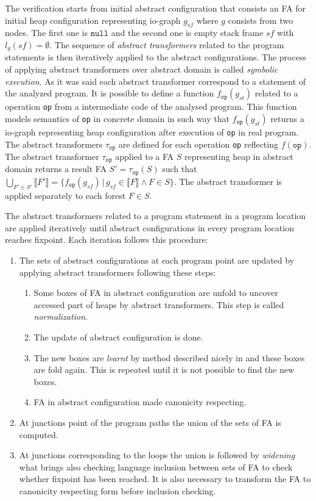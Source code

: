The verification starts from initial abstract configuration that consists an FA for initial heap configuration representing io-graph
$g_{sf}$ where $g$ consists from two nodes.
The first one is $\texttt{null}$ and the second one is empty stack frame $sf$ with $l_g(sf) = \emptyset$.
The sequence of \emph{abstract transformers} related to the program statements is then iteratively applied to the abstract configurations.
The process of applying abstract transformers over abstract domain is called \emph{symbolic execution}.
As it was said each abstract transformer correspond to a statement of the analyzed program.
It is possible to define a function $f_{\texttt{op}}(g_{st})$ related to a operation \texttt{op} from a intermediate code of the analysed program.
This function models semantics of \texttt{op} in concrete domain in such way that $f_{\texttt{op}}(g_{st})$
returns a io-graph representing heap configuration after execution of \texttt{op} in real program.
The abstract transformers $\tau_{\texttt{op}}$ are defined for each operation \texttt{op} reflecting $f(\texttt{op})$.
The abstract transformer $\tau_{\texttt{op}}$ applied to a FA $S$ representing heap in abstract domain returns a result FA $S' = \tau_{\texttt{op}}(S)$
such that $\bigcup_{F' \in S'} \llbracket F' \rrbracket = \{ f_{\texttt{op}}(g_{sf}) \,|\, g_{sf} \in \llbracket F \rrbracket \wedge F \in S \}$.
The abstract transformer is applied separately to each forest $F \in S$.

The abstract transformers related to a program statement in a program location are applied iteratively until
abstract configurations in every program location reaches fixpoint.
Each iteration follows this procedure:
\begin{enumerate}
		\item The sets of abstract configurations at each program point are updated by applying abstract transformers following
			these steps:
			\begin{enumerate}
				\item Some boxes of FA in abstract configuration are unfold to uncover accessed part of heaps by abstract transformers.
					This step is called \emph{normalization}.
				\item The update of abstract configuration is done.
				\item The new boxes are \emph{learnt} by method described nicely in \cite{forester13}
					and these boxes are fold again.
					This is repeated until it is not possible to find the new boxes.
				\item FA in abstract configuration made canonicity respecting.
			\end{enumerate}
		\item At junctions point of the program paths the union of the sets of FA is computed.
		\item At junctions corresponding to the loops the union is followed by \emph{widening}
			what brings also checking language inclusion between sets of FA to check whether fixpoint has been reached.
			It is also necessary to transform the FA to canonicity respecting form before inclusion checking.
\end{enumerate}

